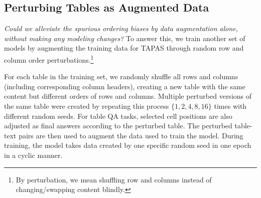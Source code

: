 \documentclass[11pt]{article}
\newcommand{\ag}[1]{{\color{blue} AG: #1}}
\begin{document}
\subsection{Perturbing Tables as Augmented Data}
\label{sec:aug}
\emph{Could we alleviate the spurious ordering biases by data augmentation alone, without making any modeling changes?} To answer this, we train another set of models by augmenting the training data for TAPAS through random row and column order perturbations.\footnote{By perturbation, we mean shuffling row and columns instead of changing/swapping content blindly.} 

For each table in the training set, we randomly shuffle all rows and columns (including corresponding column headers), creating a new table with the same content but different orders of rows and columns. Multiple perturbed versions of the same table were created by repeating this process $\{1, 2, 4, 8, 16\}$ times with different random seeds. For table QA tasks, selected cell positions are also adjusted as final answers according to the perturbed table. The perturbed table-text pairs are then used to augment the data used to train the model. During training, the model takes data created by one specific random seed in one epoch in a cyclic manner. 
\end{document}
